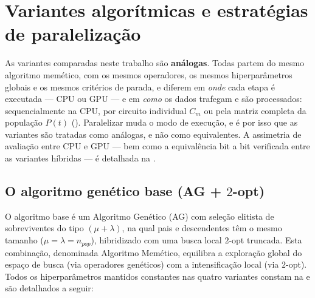 \section{Variantes algorítmicas e estratégias de paralelização}\label{sec-32-arquitetura-variantes}

As variantes comparadas neste trabalho são \textbf{análogas}.
Todas partem do mesmo algoritmo memético, com os mesmos operadores, os mesmos hiperparâmetros globais e os mesmos critérios de parada, e diferem em \emph{onde} cada etapa é executada --- CPU ou GPU --- e em \emph{como} os dados trafegam e são processados: sequencialmente na CPU, por circuito individual \(C_m\) ou pela matriz completa da população \(P(t)\) ().
Paralelizar muda o modo de execução, e é por isso que as variantes são tratadas como análogas, e não como equivalentes.
A assimetria de avaliação entre CPU e GPU --- bem como a equivalência bit a bit verificada entre as variantes híbridas --- é detalhada na .

\subsection{O algoritmo genético base (AG + \texorpdfstring{\(2\)-opt}{2-opt})}\label{sec-321-ga-base}

O algoritmo base é um Algoritmo Genético (AG) com seleção elitista de sobreviventes do tipo \((\mu + \lambda)\), na qual pais e descendentes têm o mesmo tamanho (\(\mu = \lambda = n_{pop}\)), hibridizado com uma busca local \(2\)-opt truncada.
Esta combinação, denominada Algoritmo Memético, equilibra a exploração global do espaço de busca (via operadores genéticos) com a intensificação local (via \(2\)-opt).
Todos os hiperparâmetros mantidos constantes nas quatro variantes constam na  e são detalhados a seguir:

